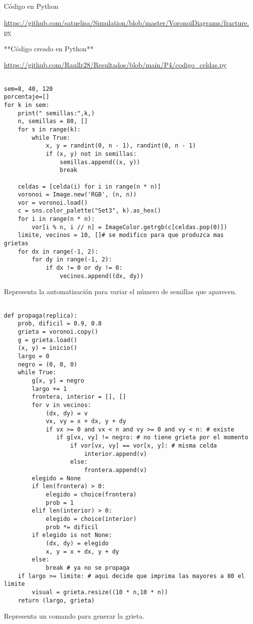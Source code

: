 \documentclass{article}
\begin{document}
 Código en Python 

\url{https://github.com/satuelisa/Simulation/blob/master/VoronoiDiagrams/fracture.py}

**Código creado en Python**

\url{https://github.com/Raullr28/Resultados/blob/main/P4/codigo_celdas.py}
\renewcommand{\listingscaption}{Código}
\begin{listing}[H]
  \begin{verbatim}
  
sem=8, 40, 120
porcentaje=[]
for k in sem:
    print(" semillas:",k,)
    n, semillas = 80, []
    for s in range(k):
        while True:
            x, y = randint(0, n - 1), randint(0, n - 1)
            if (x, y) not in semillas:
                semillas.append((x, y))
                break
 
    celdas = [celda(i) for i in range(n * n)]
    voronoi = Image.new('RGB', (n, n))
    vor = voronoi.load()
    c = sns.color_palette("Set3", k).as_hex()
    for i in range(n * n):
        vor[i % n, i // n] = ImageColor.getrgb(c[celdas.pop(0)])
    limite, vecinos = 10, []# se modifico para que produzca mas grietas
    for dx in range(-1, 2):
        for dy in range(-1, 2):
            if dx != 0 or dy != 0:
                vecinos.append((dx, dy))
  \end{verbatim}
  \label{lst:fibo}
  \caption{Representa la automatización para variar el número de semillas que aparecen.}
\end{listing}
\renewcommand{\listingscaption}{Código}
\begin{listing}[H]
  \begin{verbatim}
 
def propaga(replica):
    prob, dificil = 0.9, 0.8
    grieta = voronoi.copy()
    g = grieta.load()
    (x, y) = inicio()
    largo = 0
    negro = (0, 0, 0)
    while True:
        g[x, y] = negro
        largo += 1
        frontera, interior = [], []
        for v in vecinos:
            (dx, dy) = v
            vx, vy = x + dx, y + dy
            if vx >= 0 and vx < n and vy >= 0 and vy < n: # existe
               if g[vx, vy] != negro: # no tiene grieta por el momento
                   if vor[vx, vy] == vor[x, y]: # misma celda
                       interior.append(v)
                   else:
                       frontera.append(v)
        elegido = None
        if len(frontera) > 0:
            elegido = choice(frontera)
            prob = 1
        elif len(interior) > 0:
            elegido = choice(interior)
            prob *= dificil
        if elegido is not None:
            (dx, dy) = elegido
            x, y = x + dx, y + dy
        else:
            break # ya no se propaga
    if largo >= limite: # aqui decide que imprima las mayores a 80 el limite
        visual = grieta.resize((10 * n,10 * n))
    return (largo, grieta)
  \end{verbatim}
  \label{lst:fibo}
  \caption{Representa un comando para generar la grieta.}
\end{listing}
\end{document}
